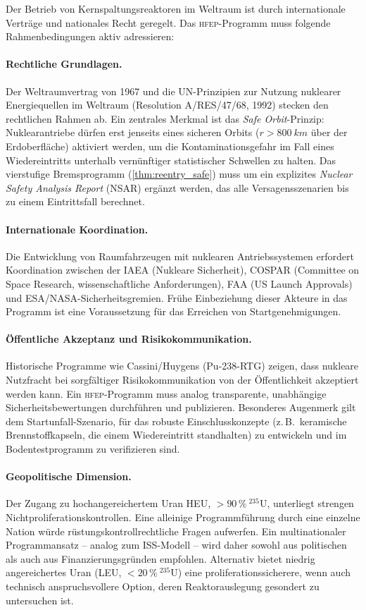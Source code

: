 ﻿\documentclass[a4paper,12pt,twoside]{article}
\theoremstyle{plain}
\theoremstyle{definition}
\theoremstyle{remark}
\newcommand{\HFEP}{\textsc{hfep}}
\begin{document}
	Der Betrieb von Kernspaltungsreaktoren im Weltraum ist durch internationale
	Verträge und nationales Recht geregelt. Das \HFEP-Programm muss folgende
	Rahmenbedingungen aktiv adressieren:

	\paragraph{Rechtliche Grundlagen.}
	Der Weltraumvertrag von 1967 und die UN-Prinzipien zur Nutzung nuklearer
	Energiequellen im Weltraum (Resolution A/RES/47/68, 1992) stecken den
	rechtlichen Rahmen ab. Ein zentrales Merkmal ist das
	\emph{Safe Orbit}-Prinzip: Nuklearantriebe dürfen erst jenseits eines
	sicheren Orbits ($r > \SI{800}{km}$ über der Erdoberfläche) aktiviert
	werden, um die Kontaminationsgefahr im Fall eines Wiedereintritts
	unterhalb vernünftiger statistischer Schwellen zu halten. Das vierstufige
	Bremsprogramm (\cref{thm:reentry_safe}) muss um ein explizites
	\emph{Nuclear Safety Analysis Report} (NSAR) ergänzt werden, das alle
	Versagensszenarien bis zu einem Eintrittsfall berechnet.

	\paragraph{Internationale Koordination.}
	Die Entwicklung von Raumfahrzeugen mit nuklearen Antriebssystemen erfordert
	Koordination zwischen der IAEA (Nukleare Sicherheit), COSPAR (Committee
	on Space Research, wissenschaftliche Anforderungen), FAA (US Launch
	Approvals) und ESA/NASA-Sicherheitsgremien. Frühe Einbeziehung dieser
	Akteure in das Programm ist eine Voraussetzung für das Erreichen von
	Startgenehmigungen.

	\paragraph{Öffentliche Akzeptanz und Risikokommunikation.}
	Historische Programme wie Cassini/Huygens (Pu-238-RTG) zeigen, dass
	nukleare Nutzfracht bei sorgfältiger Risikokommunikation von der
	Öffentlichkeit akzeptiert werden kann. Ein \HFEP-Programm muss analog
	transparente, unabhängige Sicherheitsbewertungen durchführen und publizieren.
	Besonderes Augenmerk gilt dem Startunfall-Szenario, für das robuste
	Einschlusskonzepte (z.\,B.\ keramische Brennstoffkapseln, die einem
	Wiedereintritt standhalten) zu entwickeln und im Bodentestprogramm
	zu verifizieren sind.

	\paragraph{Geopolitische Dimension.}
	Der Zugang zu hochangereichertem Uran HEU, $>90\,\%\ ^{235}$U,
	unterliegt strengen Nichtproliferationskontrollen. Eine alleinige
	Programmführung durch eine einzelne Nation würde rüstungskontrollrechtliche
	Fragen aufwerfen. Ein multinationaler Programmansatz -- analog zum ISS-Modell --
	wird daher sowohl aus politischen als auch aus Finanzierungsgründen empfohlen.
	Alternativ bietet niedrig angereichertes Uran (LEU, $<20\,\%\ ^{235}$U)
	eine proliferationssicherere, wenn auch technisch anspruchsvollere Option,
	deren Reaktorauslegung gesondert zu untersuchen ist.
\end{document}
